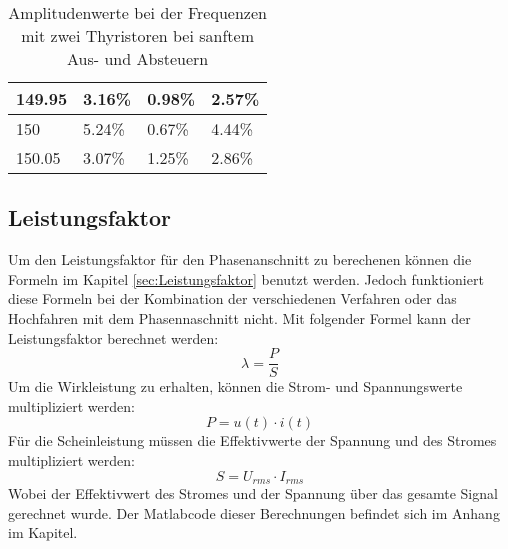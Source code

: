 \begin{table}[ht!]
\begin{tabular}{|l|l|l|l|}
		149.95            & 3.16\%                                                                              & 0.98\%                                                                              & 2.57\%                                                                              \\ \hline
		150               & 5.24\%                                                                              & 0.67\%                                                                              & 4.44\%                                                                              \\ \hline
		150.05            & 3.07\%                                                                              & 1.25\%                                                                              & 2.86\%                                                                              \\ \hline
	\end{tabular}
\caption{Amplitudenwerte bei der Frequenzen mit zwei Thyristoren bei sanftem Aus- und Absteuern}\label{tab:Mess_2Thyristoren_Spannung_ASM_AufAb_sanft}
\end{table}

\newpage
\subsection{Leistungsfaktor}
Um den Leistungsfaktor für den Phasenanschnitt zu berechenen können die Formeln im Kapitel \ref{sec:Leistungsfaktor} benutzt werden. Jedoch funktioniert diese Formeln bei der Kombination der verschiedenen Verfahren oder das Hochfahren mit dem Phasennaschnitt nicht. Mit folgender Formel kann der Leistungsfaktor berechnet werden:
\begin{equation}
\lambda = \frac{P}{S}
\end{equation}
Um die Wirkleistung zu erhalten, können die Strom- und Spannungswerte multipliziert werden:
\begin{equation}
P = u(t) \cdot i(t)
\end{equation}
Für die Scheinleistung müssen die Effektivwerte der Spannung und des Stromes multipliziert werden:
\begin{equation}
S = U_{rms} \cdot I_{rms}
\end{equation}
Wobei der Effektivwert des Stromes und der Spannung über das gesamte Signal gerechnet wurde. Der Matlabcode dieser Berechnungen befindet sich im Anhang im Kapitel.

